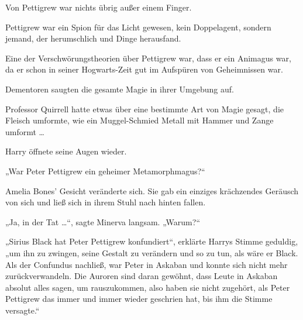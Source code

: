 Von Pettigrew war nichts übrig außer einem Finger.

Pettigrew war ein Spion für das Licht gewesen, kein Doppelagent, sondern jemand, der herumschlich und Dinge herausfand.

Eine der Verschwörungstheorien über Pettigrew war, dass er ein Animagus war, da er schon in seiner Hogwarts-Zeit gut im Aufspüren von Geheimnissen war.

Dementoren saugten die gesamte Magie in ihrer Umgebung auf.

Professor Quirrell hatte etwas über eine bestimmte Art von Magie gesagt, die Fleisch umformte, wie ein Muggel-Schmied Metall mit Hammer und Zange umformt …

Harry öffnete seine Augen wieder.

„War Peter Pettigrew ein geheimer Metamorphmagus?“

Amelia Bones’ Gesicht veränderte sich. Sie gab ein einziges krächzendes Geräusch von sich und ließ sich in ihrem Stuhl nach hinten fallen.

„Ja, in der Tat …“, sagte Minerva langsam.
„Warum?“

„Sirius Black hat Peter Pettigrew konfundiert“, erklärte Harrys Stimme geduldig,
„um ihn zu zwingen, seine Gestalt zu verändern und so zu tun, als wäre er Black. Als der Confundus nachließ, war Peter in Askaban und konnte sich nicht mehr zurückverwandeln. Die Auroren sind daran gewöhnt, dass Leute in Askaban absolut alles sagen, um rauszukommen, also haben sie nicht zugehört, als Peter Pettigrew das immer und immer wieder geschrien hat, bis ihm die Stimme versagte.“

